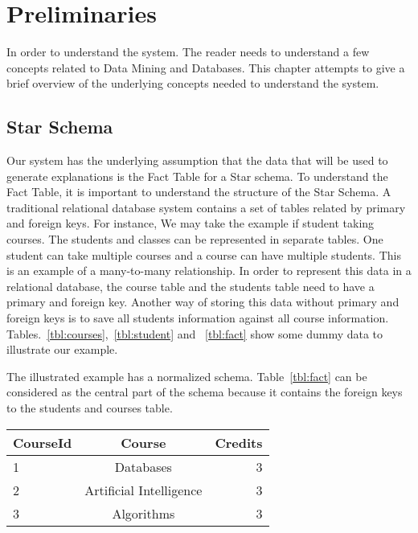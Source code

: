 \chapter{Preliminaries}
In order to understand the system. The reader needs to understand a few concepts related to Data Mining and Databases. This chapter attempts to give a brief overview of the underlying concepts needed to understand the system.

\section{Star Schema}
Our system has the underlying assumption that the data that will be used to generate explanations is the Fact Table for a Star schema. To understand the Fact Table, it is important to understand the structure of the Star Schema. A traditional relational database system contains a set of tables related by primary and foreign keys. For instance, We may take the example if student taking courses. The students and classes can be represented in separate tables. One student can take multiple courses and a course can have multiple students. This is an example of a many-to-many relationship. 
In order to represent this data in a relational database, the course table and the students table need to have a primary and foreign key. Another way of storing this data without primary and foreign keys is to save all students information against all course information. Tables.~\ref{tbl:courses},~\ref{tbl:student} and ~\ref{tbl:fact} show some dummy data to illustrate our example.

The illustrated example has a normalized schema. Table~\ref{tbl:fact} can be considered as the central part of the schema because it contains the foreign keys to the students and courses table. 



\begin{center}
  \begin{tabular}{ | l | c | r | }
    \hline
    \textbf{CourseId} & \textbf{Course} & \textbf{Credits} \\ \hline
    1 & Databases & 3 \\ \hline
    2 & Artificial Intelligence & 3 \\ \hline
    3 & Algorithms & 3 \\
    \hline
  \end{tabular}
\end{center}
\label{tbl:courses}

